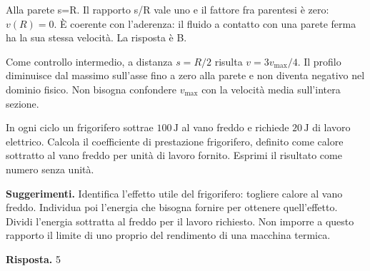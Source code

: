 \documentclass[11pt,a4paper]{article}
\begin{document}
\begin{samepage}
Alla parete s=R. Il rapporto s/R vale uno e il fattore fra parentesi è zero: \(v(R)=0\). È coerente con l’aderenza: il fluido a contatto con una parete ferma ha la sua stessa velocità. La risposta è B.\par

Come controllo intermedio, a distanza \(s=R/2\) risulta \(v=3v_{\max}/4\). Il profilo diminuisce dal massimo sull’asse fino a zero alla parete e non diventa negativo nel dominio fisico. Non bisogna confondere \(v_{\max}\) con la velocità media sull’intera sezione.\par

\end{samepage}
\newpage
\begin{samepage}
\par\smallskip
In ogni ciclo un frigorifero sottrae \(100\,\mathrm J\) al vano freddo e richiede \(20\,\mathrm J\) di lavoro elettrico. Calcola il coefficiente di prestazione frigorifero, definito come calore sottratto al vano freddo per unità di lavoro fornito. Esprimi il risultato come numero senza unità.\par



{\small\textbf{Suggerimenti.} Identifica l’effetto utile del frigorifero: togliere calore al vano freddo. Individua poi l’energia che bisogna fornire per ottenere quell’effetto. Dividi l’energia sottratta al freddo per il lavoro richiesto. Non imporre a questo rapporto il limite di uno proprio del rendimento di una macchina termica.\par}
\medskip\noindent\textbf{Risposta.} 5\par


\end{samepage}
\end{document}
